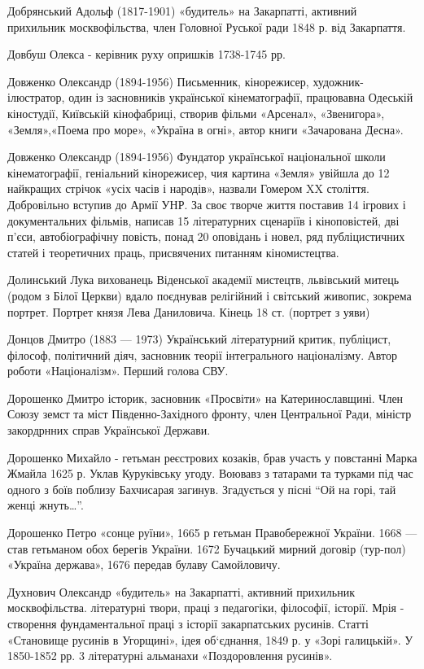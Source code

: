 Добрянський Адольф (1817-1901)  «будитель» на Закарпатті, активний прихильник москвофільства, член Головної Руської ради 1848 р. від Закарпаття.

Довбуш Олекса  - керівник руху опришків 1738-1745 рр. 

Довженко Олександр (1894-1956) Письменник, кінорежисер, художник-ілюстратор, один із засновників української кінематографії, працювавна Одеській кіностудії, Київській кінофабриці, створив фільми «Арсенал», «Звенигора», «Земля»,«Поема про море», «Україна в огні», автор книги «Зачарована Десна». 

Довженко Олександр (1894-1956) Фундатор української національної школи кінематографії, геніальний кінорежисер, чия картина «Земля» увійшла до 12 найкращих стрічок «усіх часів і народів», назвали Гомером XX століття. Добровільно вступив до Армії УНР. За своє творче життя поставив 14 ігрових і документальних фільмів, написав 15 літературних сценаріїв і кіноповістей, дві п'єси, автобіографічну повість, понад 20 оповідань і новел, ряд публіцистичних статей і теоретичних праць, присвячених питанням кіномистецтва.

Долинський Лука  вихованець Віденської академії мистецтв, львівський митець (родом з Білої Церкви) вдало поєднував релігійний і світський живопис, зокрема портрет. Портрет князя Лева Даниловича. Кінець 18 ст. (портрет з уяви) 

Донцов Дмитро (1883 --- 1973) Український літературний критик, публіцист, філософ, політичний діяч, засновник теорії інтегрального націоналізму. Автор роботи «Націоналізм». Перший голова СВУ.

Дорошенко Дмитро історик, засновник «Просвіти» на Катеринославщині. Член Союзу земст та міст Південно-Західного фронту, член Центральної Ради, міністр закордрнних справ Української Держави. 

Дорошенко Михайло  - гетьман реєстрових козаків, брав участь у повстанні Марка Жмайла 1625 р. Уклав Куруківську угоду. Воювавз з татарами та турками під час одного з боїв поблизу Бахчисарая загинув. Згадується у пісні “Ой на горі, тай женці жнуть…”.

Дорошенко Петро  «сонце руїни», 1665 р гетьман Правобережної України. 1668 --- став гетьманом обох берегів України. 1672 Бучацький мирний договір (тур-пол) «Україна держава», 1676 передав булаву Самойловичу.

Духнович Олександр «будитель» на Закарпатті, активний прихильник москвофільства. літературні твори, праці з педагогіки, філософії, історії. Мрія - створення фундаментальної праці з історії закарпатських русинів. Статті «Становище русинів в Угорщині», ідея об‘єднання, 1849 р. у «Зорі галицькій». У 1850-1852 рр. 3 літературні альманахи «Поздоровлення русинів».

